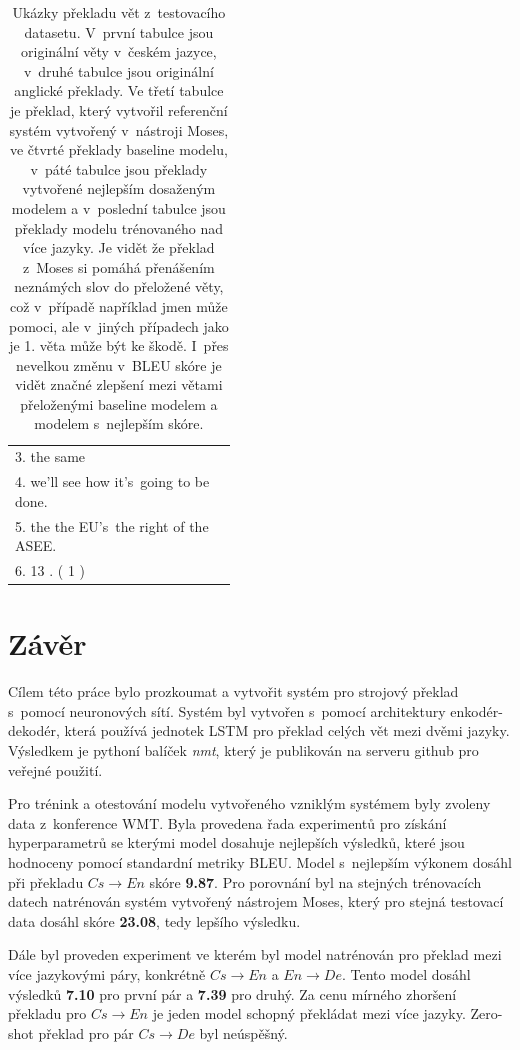 \begin{table}[H]
\begin{center}
\begin{tabular}{p{0.44\linewidth}}
          3. the same \\
          4. we'll see how it's~going to be done. \\
          5. the the EU's~the right of the ASEE. \\
          6. 13 . ( 1 ) \\
          \bottomrule
        \end{tabular}
    \end{center}
	\caption{Ukázky překladu vět z~testovacího datasetu. V~první tabulce jsou originální věty v~českém jazyce, v~druhé tabulce jsou originální anglické překlady. Ve třetí tabulce je překlad, který vytvořil referenční systém vytvořený v~nástroji Moses, ve čtvrté překlady baseline modelu, v~páté tabulce jsou překlady vytvořené nejlepším dosaženým modelem a v~poslední tabulce jsou překlady modelu trénovaného nad více jazyky. Je vidět že překlad z~Moses si pomáhá přenášením neznámých slov do přeložené věty, což v~případě například jmen může pomoci, ale v~jiných případech jako je 1. věta může být ke škodě. I~přes nevelkou změnu v~BLEU skóre je vidět značné zlepšení mezi větami přeloženými baseline modelem a modelem s~nejlepším skóre.}
	\label{img:exampleResults}
\end{table}

\chapter{Závěr}
Cílem této práce bylo prozkoumat a vytvořit systém pro strojový překlad s~pomocí neuronových sítí. Systém byl vytvořen s~pomocí architektury enkodér-dekodér, která používá jednotek LSTM pro překlad celých vět mezi dvěmi jazyky. Výsledkem je pythoní balíček \emph{nmt}, který je publikován na serveru github pro veřejné použití.

Pro trénink a otestování modelu vytvořeného vzniklým systémem byly zvoleny data z~konference WMT. Byla provedena řada experimentů pro získání hyperparametrů se kterými model dosahuje nejlepších výsledků, které jsou hodnoceny pomocí standardní metriky BLEU. Model s~nejlepším výkonem dosáhl při překladu $Cs\rightarrow En$ skóre \textbf{9.87}. Pro porovnání byl na stejných trénovacích datech natrénován systém vytvořený nástrojem Moses, který pro stejná testovací data dosáhl skóre \textbf{23.08}, tedy lepšího výsledku.

Dále byl proveden experiment ve kterém byl model natrénován pro překlad mezi více jazykovými páry, konkrétně $Cs\rightarrow En$ a $En\rightarrow De$. Tento model dosáhl výsledků \textbf{7.10} pro první pár a \textbf{7.39} pro druhý. Za cenu mírného zhoršení překladu pro $Cs\rightarrow En$ je jeden model schopný překládat mezi více jazyky. Zero-shot překlad pro pár $Cs\rightarrow De$ byl neúspěšný.

